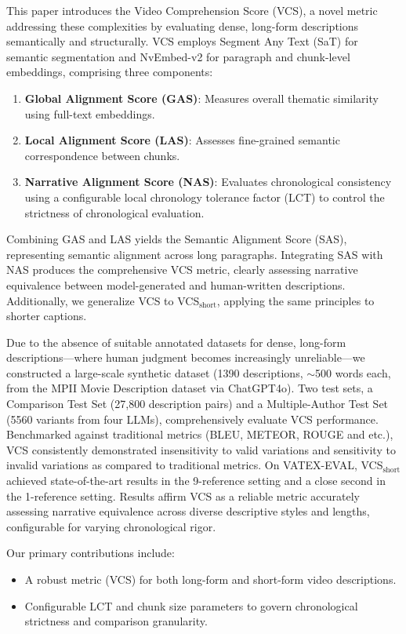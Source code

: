 \documentclass[letterpaper]{article} %
\begin{document}
This paper introduces the Video Comprehension Score (VCS), a novel metric addressing these complexities by evaluating dense, long-form descriptions semantically and structurally. VCS employs Segment Any Text (SaT) \citep{frohmann-etal-2024-segment} for semantic segmentation and NvEmbed-v2 \citep{l:24} for paragraph and chunk-level embeddings, comprising three components:
\begin{enumerate}
\item \textbf{Global Alignment Score (GAS)}: Measures overall thematic similarity using full-text embeddings.
\item \textbf{Local Alignment Score (LAS)}: Assesses fine-grained semantic correspondence between chunks.
\item \textbf{Narrative Alignment Score (NAS)}: Evaluates chronological consistency using a configurable local chronology tolerance factor (LCT) to control the strictness of chronological evaluation.
\end{enumerate}

Combining GAS and LAS yields the Semantic Alignment Score (SAS), representing semantic alignment across long paragraphs. Integrating SAS with NAS produces the comprehensive VCS metric, clearly assessing narrative equivalence between model-generated and human-written descriptions. Additionally, we generalize VCS to VCS$_{\text{short}}$, applying the same principles to shorter captions.

Due to the absence of suitable annotated datasets for dense, long-form descriptions—where human judgment becomes increasingly unreliable—we constructed a large-scale synthetic dataset (1390 descriptions, $\sim$500 words each, from the MPII Movie Description dataset \citep{rohrbach2015dataset} via ChatGPT4o). Two test sets, a Comparison Test Set (27,800 description pairs) and a Multiple-Author Test Set (5560 variants from four LLMs), comprehensively evaluate VCS performance. Benchmarked against traditional metrics (BLEU, METEOR, ROUGE and etc.), VCS consistently demonstrated insensitivity to valid variations and sensitivity to invalid variations as compared to traditional metrics. On VATEX-EVAL, VCS$_{\text{short}}$ achieved state-of-the-art results in the 9-reference setting and a close second in the 1-reference setting. Results affirm VCS as a reliable metric accurately assessing narrative equivalence across diverse descriptive styles and lengths, configurable for varying chronological rigor.

Our primary contributions include:
\begin{itemize}
\item A robust metric (VCS) for both long-form and short-form video descriptions.
\item Configurable LCT and chunk size parameters to govern chronological strictness and comparison granularity.
\end{itemize}
\end{document}
